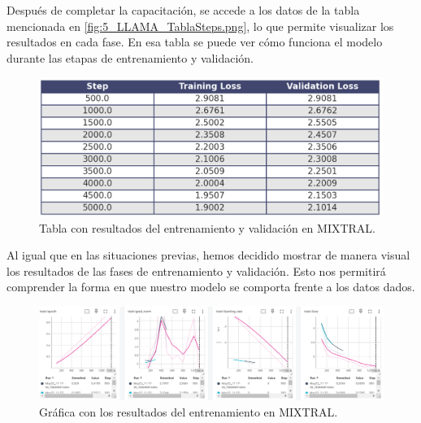 \bigskip %

Después de completar la capacitación, se accede a los datos de la tabla mencionada en \ref{fig:5_LLAMA_TablaSteps.png}, lo que permite visualizar los resultados en cada fase. En esa tabla se puede ver cómo funciona el modelo durante las etapas de entrenamiento y validación.

\bigskip %

\begin{figure}[htbp!]
  \centering
  \includegraphics[width=\textwidth,keepaspectratio]{imaxes/5_MIXTRAL_TablaTeps.png}
  \caption{Tabla con resultados del entrenamiento y validación en MIXTRAL.}
  \label{fig5_MIXTRAL_TablaTeps}
\end{figure}

\bigskip %

Al igual que en las situaciones previas, hemos decidido mostrar de manera visual los resultados de las fases de entrenamiento y validación. Esto nos permitirá comprender la forma en que nuestro modelo se comporta frente a los datos dados.

\bigskip %

\begin{figure}[htbp!]
  \centering
  \includegraphics[width=\textwidth,keepaspectratio]{imaxes/5_MIXTRAL_Grafico_Train.png}
  \caption{Gráfica con los resultados del entrenamiento en MIXTRAL.}
  \label{fig:5_MIXTRAL_Grafico_Train}
\end{figure}

\bigskip %

